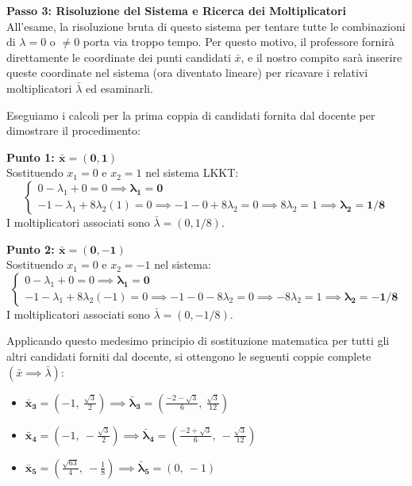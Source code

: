 \documentclass[12pt, a4paper]{article}
\begin{document}
	\vspace{0.4cm}
	\textbf{Passo 3: Risoluzione del Sistema e Ricerca dei Moltiplicatori}\\
	All'esame, la risoluzione bruta di questo sistema per tentare tutte le combinazioni di $\lambda = 0$ o $\neq 0$ porta via troppo tempo. Per questo motivo, il professore fornirà direttamente le coordinate dei punti candidati $\bar{x}$, e il nostro compito sarà inserire queste coordinate nel sistema (ora diventato lineare) per ricavare i relativi moltiplicatori $\bar{\lambda}$ ed esaminarli.
	
	Eseguiamo i calcoli per la prima coppia di candidati fornita dal docente per dimostrare il procedimento:
	
	\textbf{Punto 1: $\mathbf{\bar{x} = (0, 1)}$}\\
	Sostituendo $x_1 = 0$ e $x_2 = 1$ nel sistema LKKT:
	\[
	\begin{cases}
		0 - \lambda_1 + 0 = 0 \implies \mathbf{\lambda_1 = 0} \\
		-1 - \lambda_1 + 8\lambda_2(1) = 0 \implies -1 - 0 + 8\lambda_2 = 0 \implies 8\lambda_2 = 1 \implies \mathbf{\lambda_2 = 1/8}
	\end{cases}
	\]
	I moltiplicatori associati sono $\bar{\lambda} = (0, 1/8)$.
	
	\textbf{Punto 2: $\mathbf{\bar{x} = (0, -1)}$}\\
	Sostituendo $x_1 = 0$ e $x_2 = -1$ nel sistema:
	\[
	\begin{cases}
		0 - \lambda_1 + 0 = 0 \implies \mathbf{\lambda_1 = 0} \\
		-1 - \lambda_1 + 8\lambda_2(-1) = 0 \implies -1 - 0 - 8\lambda_2 = 0 \implies -8\lambda_2 = 1 \implies \mathbf{\lambda_2 = -1/8}
	\end{cases}
	\]
	I moltiplicatori associati sono $\bar{\lambda} = (0, -1/8)$.
	
	Applicando questo medesimo principio di sostituzione matematica per tutti gli altri candidati forniti dal docente, si ottengono le seguenti coppie complete $(\bar{x} \implies \bar{\lambda})$:
	\begin{itemize}
		\item $\mathbf{\bar{x}_3} = \left(-1, \ \frac{\sqrt{3}}{2}\right) \implies \mathbf{\bar{\lambda}_3} = \left(\frac{-2 - \sqrt{3}}{6}, \ \frac{\sqrt{3}}{12}\right)$
		\item $\mathbf{\bar{x}_4} = \left(-1, \ -\frac{\sqrt{3}}{2}\right) \implies \mathbf{\bar{\lambda}_4} = \left(\frac{-2 + \sqrt{3}}{6}, \ -\frac{\sqrt{3}}{12}\right)$
		\item $\mathbf{\bar{x}_5} = \left(\frac{\sqrt{63}}{4}, \ -\frac{1}{8}\right) \implies \mathbf{\bar{\lambda}_5} = \left(0, \ -1\right)$
	\end{itemize}
	
\end{document}
